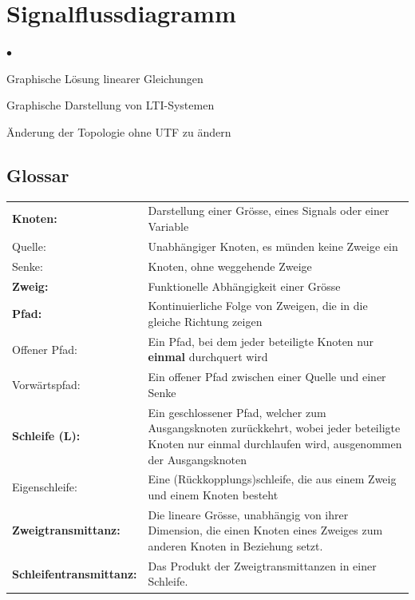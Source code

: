 \section{Signalflussdiagramm }
	\begin{list}{$\bullet$}{\setlength{\itemsep}{0cm} \setlength{\parsep}{0cm} \setlength{\topsep}{0cm}} 
	  \item Graphische Lösung linearer Gleichungen
	  \item Graphische Darstellung von LTI-Systemen
	  \item Änderung der Topologie ohne UTF zu ändern
	\end{list}
	
	\subsection{Glossar }
	  \begin{tabular}{|m{5cm} | m{13cm}|}
	    \hline
		   \textbf{Knoten:} &
		   Darstellung einer Grösse, eines Signals oder einer Variable 
		   \\
		   Quelle: &
		   Unabhängiger Knoten, es münden keine Zweige ein 
		   \\
		   Senke: &
		   Knoten, ohne weggehende Zweige 
		   \\
   		\hline
	      \textbf{Zweig:} &
	      Funktionelle Abhängigkeit einer Grösse 
	      \\
	    \hline
	      \textbf{Pfad:} &
	      Kontinuierliche Folge von Zweigen, die in die gleiche Richtung zeigen \\
	      Offener Pfad: &
	      Ein Pfad, bei dem jeder beteiligte Knoten nur \textbf{einmal} durchquert wird 
	      \\
	      Vorwärtspfad: &
	      Ein offener Pfad zwischen einer Quelle und einer Senke 
	      \\
   		\hline
	      \textbf{Schleife (L):} &
	      Ein geschlossener Pfad, welcher zum Ausgangsknoten zurückkehrt, 
	      wobei jeder beteiligte Knoten nur einmal durchlaufen wird, ausgenommen der
	      Ausgangsknoten \\
	      Eigenschleife: &
	      Eine (Rückkopplungs)schleife, die aus einem Zweig und einem Knoten besteht \\
	    \hline
	      \textbf{Zweigtransmittanz:} &
	      Die lineare Grösse, unabhängig von ihrer Dimension, 
	      die einen Knoten eines Zweiges zum anderen Knoten in Beziehung setzt. \\
	    \hline
	      \textbf{Schleifentransmittanz:} &
	      Das Produkt der Zweigtransmittanzen in einer Schleife. \\
	    \hline
	  \end{tabular}
  
